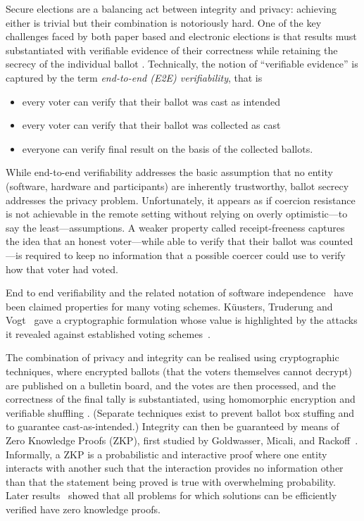 \documentclass{llncs}
\begin{document}
Secure elections are a balancing act between integrity and privacy:
achieving either is trivial but their combination is notoriously hard.
One of the key challenges faced by both paper based and electronic
elections is that results must substantiated with
verifiable evidence of their correctness while retaining the secrecy
of the individual ballot \cite{Bernhard:2017:PES}.  Technically, the
notion of ``verifiable evidence'' is captured by the term 
\emph{end-to-end (E2E) verifiability}, that is
\begin{itemize}
  \item every voter can verify that their ballot was cast as
  intended
  \item every voter can verify that their ballot was collected as
  cast
  \item everyone can verify final result on the basis of the
  collected ballots.
\end{itemize}
While end-to-end verifiability addresses the basic assumption that
no entity (software, hardware and participants) are inherently
trustworthy, ballot secrecy addresses the privacy problem.
Unfortunately, it appears as if coercion resistance is not achievable  
in the remote setting without relying on overly optimistic---to say the least---assumptions.
A weaker property called receipt-freeness captures the idea that an honest 
voter---while able to verify that their ballot was counted---is required to keep 
no information that a possible coercer could use to verify how that voter had voted.

End to end verifiability and the related notation of software independence~\cite{Rivest:2008:PTRS}
 have been claimed properties for many voting schemes.
 K{\"u}usters, Truderung and Vogt~\cite{Kusters:2010:CCS} 
 gave
 a cryptographic formulation whose value is highlighted by the attacks it revealed against established voting 
 schemes~\cite{Kusters:2012:SP}.

The combination of privacy and integrity can be realised using cryptographic techniques, where
encrypted ballots (that the voters themselves cannot decrypt) are
published on a bulletin board, and the votes are then processed, and
the correctness of the final tally is substantiated, using
homomorphic encryption \cite{Hirt:2000:ERF} and verifiable shuffling
\cite{Bayer:2012:EZK}. (Separate techniques exist to prevent ballot
box stuffing and to guarantee cast-as-intended.)
Integrity can then be guaranteed by means of Zero Knowledge Proofs
(ZKP),
first studied by Goldwasser, Micali, and Rackoff~\cite{Goldwasser:1985:STOC}.
Informally, a ZKP is a probabilistic and interactive proof where one
entity interacts with another such that the interaction provides
no information other than that the statement being proved is true with
overwhelming probability. 
Later results~\cite{Ben-Or:1988:CRYPTO,Goldreich:1991:ACM}
showed that 
all problems for which solutions can be efficiently verified have zero knowledge
proofs.
\end{document}

